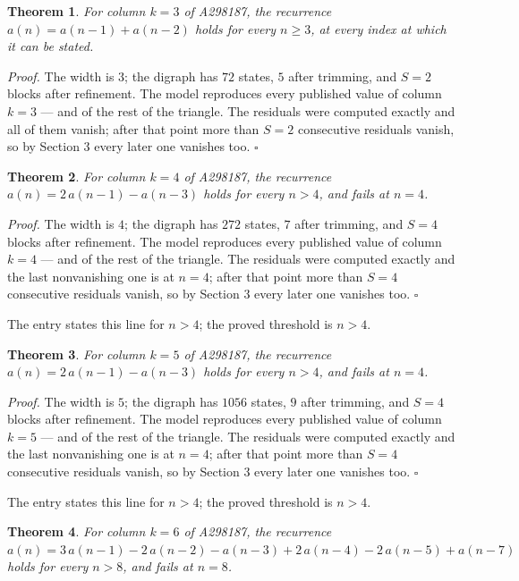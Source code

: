 \documentclass[11pt]{article}
\newtheorem{theorem}{Theorem}
\theoremstyle{definition}
\begin{document}
\begin{theorem} For column $k = 3$ of A298187, the recurrence $a(n) = a(n-1) + a(n-2)$ holds for every $n \ge 3$, at every index at which it can be stated.\end{theorem}

{\itshape Proof.} The width is $3$; the digraph has $72$ states, $5$ after trimming, and $S = 2$ blocks after refinement. The model reproduces every published value of column $k = 3$ --- and of the rest of the triangle. The residuals were computed exactly and all of them vanish; after that point more than $S = 2$ consecutive residuals vanish, so by Section 3 every later one vanishes too. $\square$

\begin{theorem} For column $k = 4$ of A298187, the recurrence $a(n) = 2\,a(n-1) - a(n-3)$ holds for every $n > 4$, and fails at $n = 4$.\end{theorem}

{\itshape Proof.} The width is $4$; the digraph has $272$ states, $7$ after trimming, and $S = 4$ blocks after refinement. The model reproduces every published value of column $k = 4$ --- and of the rest of the triangle. The residuals were computed exactly and the last nonvanishing one is at $n = 4$; after that point more than $S = 4$ consecutive residuals vanish, so by Section 3 every later one vanishes too. $\square$

The entry states this line for $n > 4$; the proved threshold is $n > 4$.

\begin{theorem} For column $k = 5$ of A298187, the recurrence $a(n) = 2\,a(n-1) - a(n-3)$ holds for every $n > 4$, and fails at $n = 4$.\end{theorem}

{\itshape Proof.} The width is $5$; the digraph has $1056$ states, $9$ after trimming, and $S = 4$ blocks after refinement. The model reproduces every published value of column $k = 5$ --- and of the rest of the triangle. The residuals were computed exactly and the last nonvanishing one is at $n = 4$; after that point more than $S = 4$ consecutive residuals vanish, so by Section 3 every later one vanishes too. $\square$

The entry states this line for $n > 4$; the proved threshold is $n > 4$.

\begin{theorem} For column $k = 6$ of A298187, the recurrence $a(n) = 3\,a(n-1) - 2\,a(n-2) - a(n-3) + 2\,a(n-4) - 2\,a(n-5) + a(n-7)$ holds for every $n > 8$, and fails at $n = 8$.\end{theorem}
\end{document}
